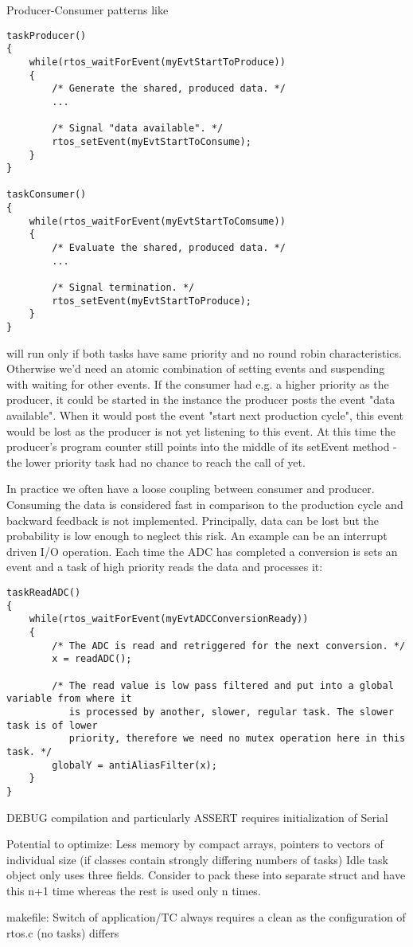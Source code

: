 Producer-Consumer patterns like
\begin{lstlisting}[float, caption=Deadlock situation in a producer/consumer implementation,
label=lstProducerConsumer, captionpos=b]
taskProducer()
{
    while(rtos_waitForEvent(myEvtStartToProduce))
    {
        /* Generate the shared, produced data. */
        ...

        /* Signal "data available". */
        rtos_setEvent(myEvtStartToConsume);
    }
}

taskConsumer()
{
    while(rtos_waitForEvent(myEvtStartToComsume))
    {
        /* Evaluate the shared, produced data. */
        ...

        /* Signal termination. */
        rtos_setEvent(myEvtStartToProduce);
    }
}
\end{lstlisting}
will run only if both tasks have same priority and no round robin characteristics.
Otherwise we'd need an atomic combination of setting events and suspending with waiting for
other events. If the consumer had e.g. a higher priority as the producer, it could be
started in the instance the producer posts the event "data available". When it would post
the event "start next production cycle", this event would be lost as the producer is not
yet listening to this event. At this time the producer's program counter still points into
the middle of its setEvent method - the lower priority task had no chance to reach the call
of  yet.

In practice we often have a loose coupling between consumer and producer. Consuming the
data is considered fast in comparison to the production cycle and backward feedback is not
implemented. Principally, data can be lost but the probability is low enough to neglect
this risk. An example can be an interrupt driven I/O operation. Each time the ADC has
completed a conversion is sets an event and a task of high priority reads the data and
processes it:
\begin{lstlisting}[float, caption=Usage of application interrupts,
label=lstSampleISRForADC, captionpos=b]
taskReadADC()
{
    while(rtos_waitForEvent(myEvtADCConversionReady))
    {
        /* The ADC is read and retriggered for the next conversion. */
        x = readADC();
        
        /* The read value is low pass filtered and put into a global variable from where it
           is processed by another, slower, regular task. The slower task is of lower
           priority, therefore we need no mutex operation here in this task. */
        globalY = antiAliasFilter(x);
    }        
}
\end{lstlisting}

DEBUG compilation and particularly ASSERT requires initialization of Serial

Potential to optimize: Less memory by compact arrays, pointers to vectors
of individual size (if classes contain strongly differing numbers of
tasks)
  Idle task object only uses three fields. Consider to pack these into
separate struct and have this n+1 time whereas the rest is used only n
times.

makefile: Switch of application/TC always requires a clean as the
configuration of rtos.c (no tasks) differs
